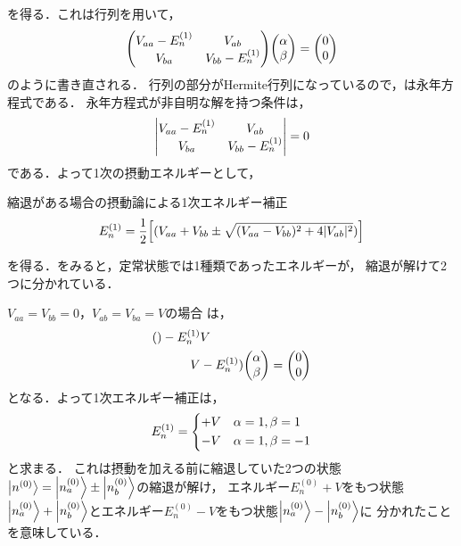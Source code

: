 \documentclass{report}
\begin{document}
  を得る．これは行列を用いて，
  \begin{align}
    \mqty(
      V_{aa} - E_n^{(1)} &  V_{ab} \\
      V_{ba} & V_{bb} - E_n^{(1)})
    \mqty(\alpha\\ \beta)
    =
    \mqty(0\\ 0)\label{secular-eq}
  \end{align}
  のように書き直される．
  行列の部分がHermite行列になっているので，は永年方程式である．
  永年方程式が非自明な解を持つ条件は，
  \begin{align}
    \mqty|
      V_{aa} - E_n^{(1)} &  V_{ab}\\
      V_{ba} & V_{bb} - E_n^{(1)}|
    = 0
  \end{align}
  である．よって1次の摂動エネルギーとして，
  \begin{itembox}[l]{縮退がある場合の摂動論による1次エネルギー補正}
    \begin{align}
      E_n^{(1)} = \frac{1}{2}\qty[( V_{aa}+ V_{bb}\pm\sqrt{( V_{aa}- V_{bb})^2 + 4| V_{ab}|^2})]\label{1st-order-energy-with-degeneracy}
    \end{align}
  \end{itembox}
  を得る．をみると，定常状態では1種類であったエネルギーが，
  縮退が解けて2つに分かれている．
  \begin{myex}{}{}
    $ V_{aa} =  V_{bb} = 0$，$ V_{ab} =  V_{ba} =  V$の場合
    は，
    \begin{align}
      \mqty
        -E_n^{(1)} &  V\\
        V & -E_n^{(1)})
      \mqty(\alpha\\\beta)
      = \mqty(0\\ 0)
    \end{align}
    となる．よって1次エネルギー補正は，
    \begin{align}
      E_n^{(1)}=
      \begin{dcases}
        + V & \alpha = 1, \beta = 1\\
        - V & \alpha = 1, \beta = -1
      \end{dcases}
    \end{align}
    と求まる．
    これは摂動を加える前に縮退していた2つの状態$\ket{n^{(0)}} = \ket{n_a^{(0)}}\pm\ket{n_b^{(0)}}$の縮退が解け，
    エネルギー$E_n^{(0)} +  V$をもつ状態$\ket{n_a^{(0)}} + \ket{n_b^{(0)}}$とエネルギー$E_n^{(0)} -  V$をもつ状態$\ket{n_a^{(0)}} - \ket{n_b^{(0)}}$に
    分かれたことを意味している．
  \end{myex}
\end{document}
